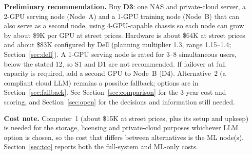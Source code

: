 \textbf{Preliminary recommendation.} Buy \textbf{D3}: one NAS and private-cloud server, a
2-GPU serving node (Node~A) and a 1-GPU training node (Node~B) that can also serve as a
second node, using 4-GPU-capable chassis so each node can grow by about \$9K per GPU at
street prices. Hardware is about \$64K at street prices and about \$83K configured by
Dell (planning multiplier 1.3, range 1.15--1.4; Section~\ref{sec:dell}). A 1-GPU serving
node is rated for 3--8 simultaneous users, below the stated 12, so S1 and D1 are not
recommended. If failover at full capacity is required, add a second GPU to Node~B (D4).
Alternative~2 (a compliant cloud LLM) remains a possible fallback; options are in
Section~\ref{sec:fallback}. See Section~\ref{sec:comparison} for the 3-year cost and
scoring, and Section~\ref{sec:open} for the decisions and information still needed.

\textbf{Cost note.} Computer~1 (about \$15K at street prices, plus its setup and upkeep)
is needed for the storage, licensing and private-cloud purposes whichever LLM option is
chosen, so the cost that differs between alternatives is the ML node(s).
Section~\ref{sec:tco} reports both the full-system and ML-only costs.
